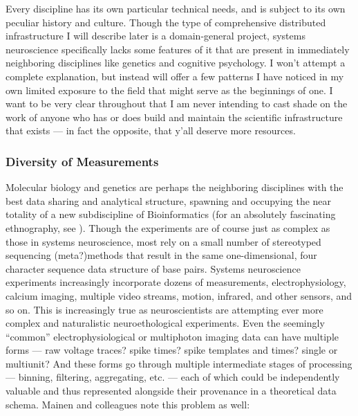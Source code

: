 \documentclass[10pt]{article}
\begin{document}
\begin{multicols}{2}


Every discipline has its own particular technical needs, and is subject
to its own peculiar history and culture. Though the type of
comprehensive distributed infrastructure I will describe later is a
domain-general project, systems neuroscience specifically lacks some
features of it that are present in immediately neighboring disciplines
like genetics and cognitive psychology. I won't attempt a complete
explanation, but instead will offer a few patterns I have noticed in my
own limited exposure to the field that might serve as the beginnings of
one. I want to be very clear throughout that I am never intending to
cast shade on the work of anyone who has or does build and maintain the
scientific infrastructure that exists --- in fact the opposite, that
y'all deserve more resources.

\hypertarget{diversity-of-measurements}{%
\subsubsection{Diversity of
Measurements}\label{diversity-of-measurements}}

Molecular biology and genetics are perhaps the neighboring disciplines
with the best data sharing and analytical structure, spawning and
occupying the near totality of a new subdiscipline of Bioinformatics
(for an absolutely fascinating ethnography, see \cite{bietzCollaborationMetagenomicsSequence2009} ). Though the experiments
are of course just as complex as those in systems neuroscience, most
rely on a small number of stereotyped sequencing (meta?)methods that
result in the same one-dimensional, four character sequence data
structure of base pairs. Systems neuroscience experiments increasingly
incorporate dozens of measurements, electrophysiology, calcium imaging,
multiple video streams, motion, infrared, and other sensors, and so on.
This is increasingly true as neuroscientists are attempting ever more
complex and naturalistic neuroethological experiments. Even the
seemingly ``common'' electrophysiological or multiphoton imaging data
can have multiple forms --- raw voltage traces? spike times? spike
templates and times? single or multiunit? And these forms go through
multiple intermediate stages of processing --- binning, filtering,
aggregating, etc. --- each of which could be independently valuable and
thus represented alongside their provenance in a theoretical data
schema. Mainen and colleagues note this problem as well:


\end{multicols}
\end{document}
